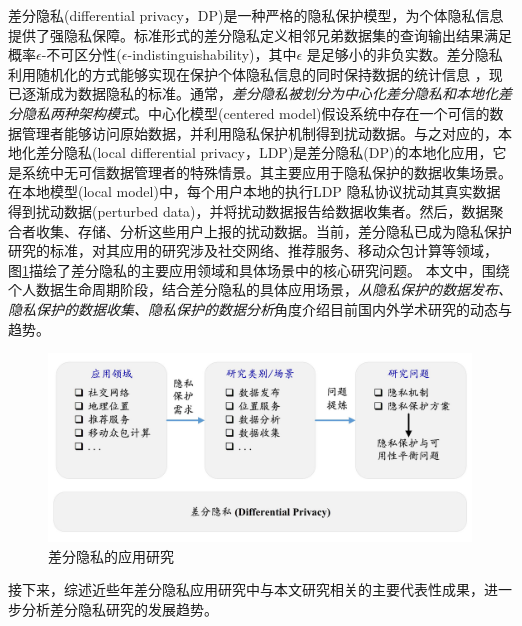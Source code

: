差分隐私(differential privacy，DP)是一种严格的隐私保护模型，为个体隐私信息提供了强隐私保障。标准形式的差分隐私\cite{dwork2006differential,dwork2006calibrating}定义相邻兄弟数据集的查询输出结果满足概率$\epsilon$-不可区分性($\epsilon$-indistinguishability)，其中$\epsilon$ 是足够小的非负实数。差分隐私利用随机化的方式能够实现在保护个体隐私信息的同时保持数据的统计信息
\cite{dwork2006differential,dwork2006calibrating,dwork2008differential}，现已逐渐成为数据隐私的标准。通常，{\em 差分隐私被划分为中心化差分隐私和本地化差分隐私两种架构模式}\cite{dwork2014algorithmic}。中心化模型(centered model)假设系统中存在一个可信的数据管理者能够访问原始数据，并利用隐私保护机制得到扰动数据。与之对应的，本地化差分隐私(local differential privacy，LDP)\cite{kasiviswanathan2011what,duchi2013local}是差分隐私(DP)的本地化应用，它是系统中无可信数据管理者的特殊情景。其主要应用于隐私保护的数据收集场景。在本地模型(local model)中，每个用户本地的执行LDP 隐私协议扰动其真实数据得到扰动数据(perturbed data)，并将扰动数据报告给数据收集者。然后，数据聚合者收集、存储、分析这些用户上报的扰动数据。当前，差分隐私已成为隐私保护研究的标准，对其应用的研究涉及社交网络\cite{wei2020asgldp,kasiviswanathan2013analyzing}、推荐服务\cite{xiao2020deep}、移动众包计算\cite{sei2017differential}等领域，%
图\ref{fig:chapter02-application-research}描绘了差分隐私的主要应用领域和具体场景中的核心研究问题。
本文中，围绕个人数据生命周期阶段，结合差分隐私的具体应用场景，{\em 从隐私保护的数据发布、隐私保护的数据收集、隐私保护的数据分析}角度介绍目前国内外学术研究的动态与趋势。%

\begin{figure}[htbp]
	\centering
	\includegraphics[width = 0.85\linewidth]{./figures/chapter02_3.jpg}
	\caption{差分隐私的应用研究}
	\label{fig:chapter02-application-research}
\end{figure}

接下来，综述近些年差分隐私应用研究中与本文研究相关的主要代表性成果，进一步分析差分隐私研究的发展趋势。

